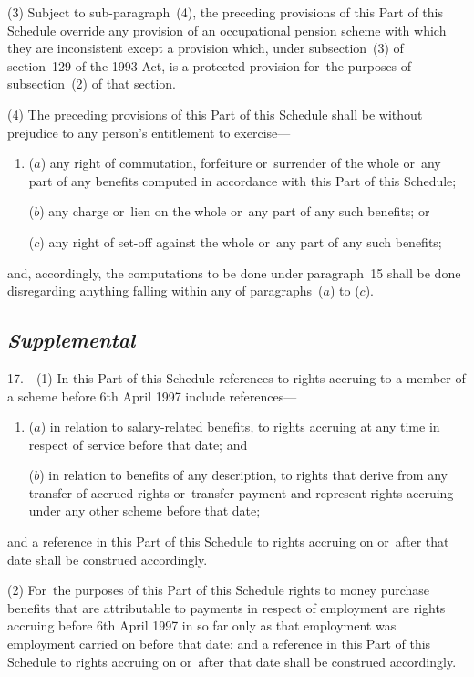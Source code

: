 \documentclass[12pt,a4paper]{article}
\begin{document}
(3) Subject to sub-paragraph~(4), the preceding provisions of this Part of this Schedule override any provision of an occupational pension scheme with which they are inconsistent except a provision which, under subsection~(3)  of section~129 of the 1993 Act, is a protected provision for~the purposes of subsection~(2)  of that section.

(4) The preceding provisions of this Part of this Schedule shall be without prejudice to any person’s entitlement to exercise—
\begin{enumerate}\item[]
($a$) any right of commutation, forfeiture or~surrender of the whole or~any part of any benefits computed in accordance with this Part of this Schedule;

($b$) any charge or~lien on the whole or~any part of any such benefits; or

($c$) any right of set-off against the whole or~any part of any such benefits;
\end{enumerate}
and, accordingly, the computations to be done under paragraph~15 shall be done disregarding anything falling within any of paragraphs~($a$)  to ($c$).

\subsection*{\itshape Supplemental}

17.---(1) In this Part of this Schedule references to rights accruing to a member of a scheme before 6th April 1997 include references—
\begin{enumerate}\item[]
($a$) in relation to salary-related benefits, to rights accruing at any time in respect of service before that date; and

($b$) in relation to benefits of any description, to rights that derive from any transfer of accrued rights or~transfer payment and represent rights accruing under any other scheme before that date;
\end{enumerate}
and a reference in this Part of this Schedule to rights accruing on or~after that date shall be construed accordingly.

(2) For~the purposes of this Part of this Schedule rights to money purchase benefits that are attributable to payments in respect of employment are rights accruing before 6th April 1997 in so far only as that employment was employment carried on before that date; and a reference in this Part of this Schedule to rights accruing on or~after that date shall be construed accordingly.
\end{document}
